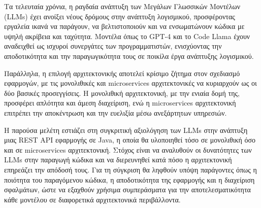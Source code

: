 Τα τελευταία χρόνια, η ραγδαία ανάπτυξη των Μεγάλων Γλωσσικών Μοντέλων (LLMs) έχει ανοίξει νέους δρόμους στην ανάπτυξη λογισμικού, προσφέροντας εργαλεία ικανά να παράγουν, να βελτιστοποιούν και να ενσωματώνουν κώδικα με υψηλή ακρίβεια και ταχύτητα. Μοντέλα όπως το GPT-4 και το Code Llama έχουν αναδειχθεί ως ισχυροί συνεργάτες των προγραμματιστών, ενισχύοντας την αποδοτικότητα και την παραγωγικότητα τους σε ποικίλα έργα ανάπτυξης λογισμικού.

Παράλληλα, η επιλογή αρχιτεκτονικής αποτελεί κρίσιμο ζήτημα στον σχεδιασμό εφαρμογών, με τις μονολιθικές και microservices αρχιτεκτονικές να κυριαρχούν ως οι δύο βασικές προσεγγίσεις. Η μονολιθική αρχιτεκτονική, με την ενιαία δομή της, προσφέρει απλότητα και άμεση διαχείριση, ενώ η microservices αρχιτεκτονική επιτρέπει την αποκέντρωση και την ευελιξία μέσω ανεξάρτητων υπηρεσιών.

Η παρούσα μελέτη εστιάζει στη συγκριτική αξιολόγηση των LLMs στην ανάπτυξη μιας REST API εφαρμογής σε Java, η οποία θα υλοποιηθεί τόσο σε μονολιθική όσο και σε microservices αρχιτεκτονική. Στόχος είναι να αναλυθούν οι δυνατότητες των LLMs στην παραγωγή κώδικα και να διερευνηθεί κατά πόσο η αρχιτεκτονική επηρεάζει την απόδοσή τους. Για τη σύγκριση θα ληφθούν υπόψη παράγοντες όπως η ποιότητα του παραγόμενου κώδικα, η αποδοτικότητα της εφαρμογής και η διαχείριση σφαλμάτων, ώστε να εξαχθούν χρήσιμα συμπεράσματα για την αποτελεσματικότητα κάθε μοντέλου σε διαφορετικά αρχιτεκτονικά περιβάλλοντα.